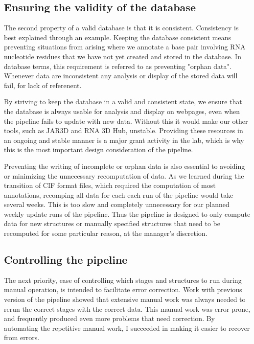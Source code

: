 \subsection{Ensuring the validity of the database}

The second property of a valid database is that it is consistent. Consistency is
best explained through an example. Keeping the database consistent means
preventing situations from arising where we annotate a base pair involving RNA
nucleotide residues that we have not yet created and stored in the database. In
database terms, this requirement is referred to as preventing "orphan data".
Whenever data are inconsistent any analysis or display of the stored data will
fail, for lack of referenent.

By striving to keep the database in a valid and consistent state, we ensure that
the database is always usable for analysis and display on webpages, even when
the pipeline fails to update with new data. Without this it would make our other
tools, such as JAR3D and RNA 3D Hub, unstable. Providing these resources in an
ongoing and stable manner is a major grant activity in the lab, which is why
this is the most important design consideration of the pipeline.

Preventing the writing of incomplete or orphan data is also essential to
avoiding or minimizing the unnecessary recomputation of data. As we learned
during the transition of CIF format files, which required the computation of
most annotations, recomping all data for each each run of the pipeline would
take several weeks. This is too slow and completely unnecessary for our planned
weekly update runs of the pipeline. Thus the pipeline is designed to only
compute data for new structures or manually specified structures that need to be
recomputed for some particular reason, at the manager's discretion.

\subsection{Controlling the pipeline}

The next priority, ease of controlling which stages and structures to run during
manual operation, is intended to facilitate error correction. Work with previous
version of the pipeline showed that extensive manual work was always needed to
rerun the correct stages with the correct data. This manual work was
error-prone, and frequently produced even more problems that need correction. By
automating the repetitive manual work, I succeeded in making it easier to
recover from errors.

